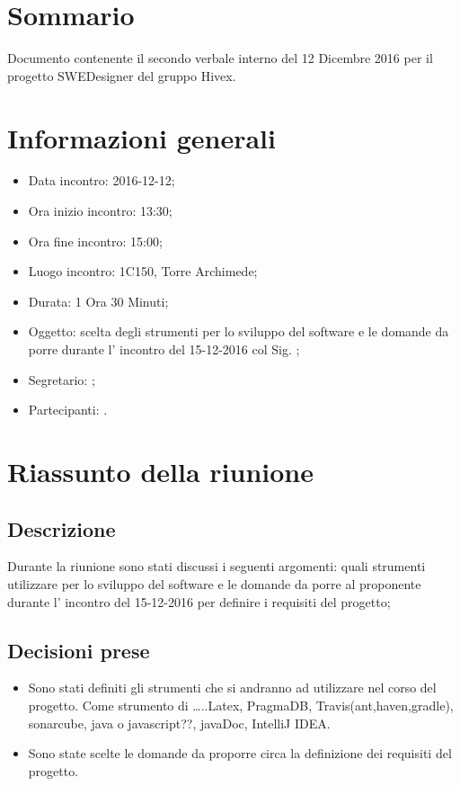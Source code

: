 


\section{Sommario}

Documento contenente il secondo verbale interno del 12 Dicembre 2016 per il progetto SWEDesigner del gruppo Hivex.

\section{Informazioni generali}
\begin{itemize}
\item {Data incontro:} 2016-12-12;
\item {Ora inizio incontro:} 13:30;
\item {Ora fine incontro:} 15:00;
\item {Luogo incontro:} 1C150, Torre Archimede; 
\item {Durata:} 1 Ora 30 Minuti;
\item {Oggetto:} scelta degli strumenti per lo sviluppo del software e le domande da porre durante l’ incontro del 15-12-2016 col Sig. \GP;
\item {Segretario:} 	\PB; 
\item {Partecipanti:} \GR.
\end{itemize}

\section{Riassunto della riunione}
\subsection{Descrizione} 
Durante la riunione sono stati discussi i seguenti argomenti: quali strumenti utilizzare per lo sviluppo del software e le domande da porre al proponente \GP durante l’ incontro del 15-12-2016 per definire i requisiti del progetto;
\subsection{Decisioni prese} 
\begin{itemize}
\item Sono stati definiti gli strumenti che si andranno ad utilizzare nel corso del progetto. Come strumento di …..Latex, PragmaDB, Travis(ant,haven,gradle), sonarcube, java o javascript??, javaDoc, IntelliJ IDEA.
\item Sono state scelte le domande da proporre circa la definizione dei requisiti del progetto.

\end{itemize}


